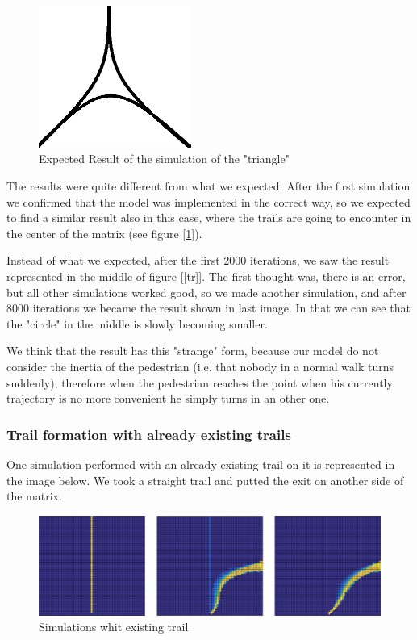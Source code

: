 \documentclass[11pt]{article}
\begin{document}
\begin{figure}[H]
        \centering
        \includegraphics[width=5cm]{Expected_Triangle.png}
        \caption{Expected Result of the simulation of the "triangle"}
        \label{exp_tr}
\end{figure}

The results were quite different from what we expected. After the first simulation we confirmed that the model was implemented in the correct way, so we expected to find a similar result also in this case, where the trails are going to encounter in the center of the matrix (see figure [\ref{exp_tr}]). 

Instead of what we expected, after the first 2000 iterations, we saw the result represented in the middle of figure [\ref{tr}]. The first thought was, there is an error, but all other simulations worked good, so we made another simulation, and after 8000 iterations we became the result shown in last image. In that we can see that the "circle" in the middle is slowly becoming smaller.

 We think that the result has this "strange" form, because our model do not consider the inertia of the pedestrian (i.e. that nobody in a normal walk turns suddenly), therefore when the pedestrian reaches the point when his currently trajectory is no more convenient he simply turns in an other one.

\subsubsection{Trail formation with already existing trails}

One simulation performed with an already existing trail on it is represented in the image below. 
We took a straight trail and putted the exit on another side of the matrix. 

\begin{figure}[H]
        \centering
        \includegraphics[width=\columnwidth]{strada.jpg}
        \caption{Simulations whit existing trail}
\end{figure}
\end{document}
